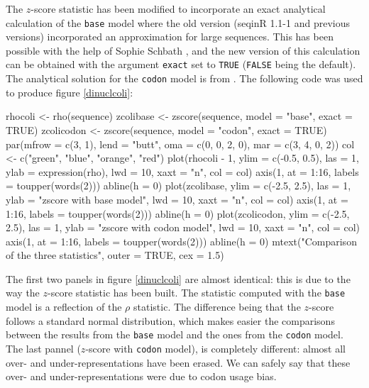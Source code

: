 \documentclass{article}
\begin{document}
The $z$-score statistic has been modified to incorporate an exact
analytical calculation of the \texttt{base} model where the old 
version (seqinR 1.1-1 and previous versions) incorporated an
approximation for large sequences. This has been possible with the
help of Sophie Schbath \cite{Schbath-thesis}, and the new version of
this calculation can be obtained with the argument \texttt{exact} 
set to \texttt{TRUE} (\texttt{FALSE} being the default). 
The analytical solution for the \texttt{codon} model is from \cite{GautierC1985}.
The following
code was used to produce figure \ref{dinuclcoli}:

\begin{Schunk}
\begin{Sinput}
 rhocoli <- rho(sequence)
 zcolibase <- zscore(sequence, model = "base", exact = TRUE)
 zcolicodon <- zscore(sequence, model = "codon", exact = TRUE)
 par(mfrow = c(3, 1), lend = "butt", oma = c(0, 0, 2, 0), mar = c(3, 
     4, 0, 2))
 col <- c("green", "blue", "orange", "red")
 plot(rhocoli - 1, ylim = c(-0.5, 0.5), las = 1, ylab = expression(rho), 
     lwd = 10, xaxt = "n", col = col)
 axis(1, at = 1:16, labels = toupper(words(2)))
 abline(h = 0)
 plot(zcolibase, ylim = c(-2.5, 2.5), las = 1, ylab = "zscore with base model", 
     lwd = 10, xaxt = "n", col = col)
 axis(1, at = 1:16, labels = toupper(words(2)))
 abline(h = 0)
 plot(zcolicodon, ylim = c(-2.5, 2.5), las = 1, ylab = "zscore with codon model", 
     lwd = 10, xaxt = "n", col = col)
 axis(1, at = 1:16, labels = toupper(words(2)))
 abline(h = 0)
 mtext("Comparison of the three statistics", outer = TRUE, 
     cex = 1.5)
\end{Sinput}
\end{Schunk}

\begin{figure}
\centering{}
\end{figure}

The first two panels in figure \ref{dinuclcoli} are almost identical: 
this is due to the way the
$z$-score statistic has been built. The statistic computed with
the \texttt{base} model is a reflection of the $\rho$ statistic. The
difference being that the $z$-score follows a standard normal
distribution, which makes easier the comparisons between the results
from the \texttt{base} model and the ones from the \texttt{codon}
model. The last pannel ($z$-score with \texttt{codon} model), is
completely different: almost all over- and under-representations have
been erased. We can safely say that these over- and
under-representations were due to codon usage bias.
\end{document}
